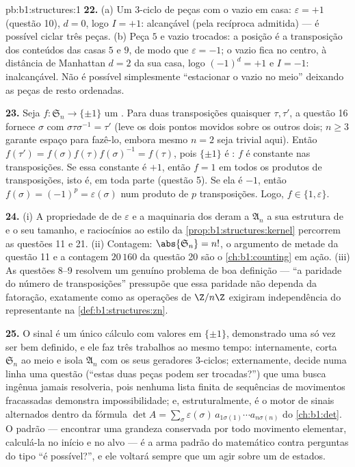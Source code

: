 \begin{solution}{pb:b1:structures:1}
\textbf{22.} (a) Um $3$-ciclo de peças com o vazio em casa:
$\varepsilon = +1$ (questão 10), $d = 0$, logo $I = +1$: alcançável
(pela recíproca admitida) --- é possível ciclar três peças.
(b) Peça $5$ e vazio trocados: a posição é a
transposição dos conteúdos das casas $5$ e $9$, de modo que
$\varepsilon = -1$; o vazio fica no centro, à distância de Manhattan
$d = 2$ da sua casa, logo $(-1)^d = +1$ e $I = -1$:
inalcançável. Não é possível simplesmente ``estacionar o vazio no meio''
deixando as peças de resto ordenadas.

\textbf{23.} Seja $f \colon \mathfrak S_n \to \{\pm1\}$ um
. Para duas transposições quaisquer $\tau, \tau'$, a questão 16
fornece $\sigma$ com $\sigma\tau\sigma^{-1} = \tau'$ (leve os
dois pontos movidos sobre os outros dois; $n \geq 3$ garante espaço
para fazê-lo, embora mesmo $n = 2$ seja trivial aqui). Então $f(\tau') =
f(\sigma)f(\tau)f(\sigma)^{-1} = f(\tau)$, pois $\{\pm1\}$ é
: $f$ é constante nas transposições. Se essa constante é
$+1$, então $f = 1$ em todos os produtos de transposições, isto é,
em toda parte (questão 5). Se ela é $-1$, então $f(\sigma) =
(-1)^p = \varepsilon(\sigma)$ num produto de $p$ transposições.
Logo, $f \in \{1, \varepsilon\}$.

\textbf{24.} (i) A propriedade de  de $\varepsilon$ e a
maquinaria dos  deram a $\mathfrak A_n$ a sua estrutura de  e
o seu tamanho, e raciocínios ao estilo da \cref{prop:b1:structures:kernel}
percorrem as questões 11 e 21. (ii) Contagem:
$\abs{\mathfrak S_n} = n!$, o argumento de metade da questão 11
e a contagem $20\,160$ da questão 20 são o
\cref{ch:b1:counting} em ação. (iii) As questões 8--9 resolvem um
genuíno problema de boa definição --- ``a paridade do número
de transposições'' pressupõe que essa paridade não dependa
da fatoração, exatamente como as operações de $\Z/n\Z$ exigiram
independência do representante na \cref{def:b1:structures:zn}.

\textbf{25.} O sinal é um único cálculo com valores em $\{\pm1\}$,
demonstrado uma só vez ser bem definido, e ele faz três
trabalhos ao mesmo tempo: internamente, corta $\mathfrak S_n$ ao meio e
isola $\mathfrak A_n$ com os seus geradores $3$-ciclos;
externamente, decide numa linha uma questão (``estas duas
peças podem ser trocadas?'') que uma busca ingênua jamais resolveria,
pois nenhuma lista finita de sequências de movimentos fracassadas
demonstra impossibilidade; e, estruturalmente, é o motor de sinais
alternados dentro da fórmula $\det A = \sum_\sigma \varepsilon(\sigma)\,
a_{1\sigma(1)}\cdots a_{n\sigma(n)}$ do \cref{ch:b1:det}. O
padrão --- encontrar uma grandeza conservada por todo movimento
elementar, calculá-la no início e no alvo --- é a arma padrão do
matemático contra perguntas do tipo ``é possível?'',
e ele voltará sempre que um  agir sobre um  de
estados.
\end{solution}

